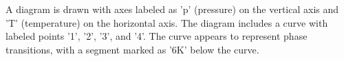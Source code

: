 A diagram is drawn with axes labeled as 'p' (pressure) on the vertical axis and 'T' (temperature) on the horizontal axis. The diagram includes a curve with labeled points '1', '2', '3', and '4'. The curve appears to represent phase transitions, with a segment marked as '6K' below the curve.